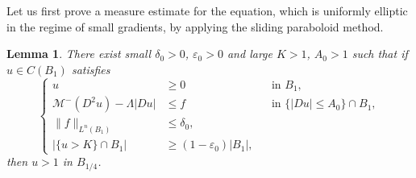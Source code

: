 \documentclass[11pt]{amsart}
\theoremstyle{plain}
\newtheorem{lemma}[theorem]{Lemma}
\theoremstyle{definition}
\numberwithin{equation}{section}
\begin{document}
Let us first prove a measure estimate for the equation, which is uniformly elliptic in the regime of small gradients, by applying the sliding paraboloid method.

\begin{lemma}\label{A00}
    There exist small $\delta_0>0$, $\varepsilon_0>0$ and large $K>1$, $A_0>1$ such that if $u \in C(B_1)$ satisfies
    \begin{equation*}
    \left\{
    \begin{aligned}
        u &\geq 0 &&\text{in } B_1,\\
        \mathcal{M}^-(D^2u)-\Lambda|Du| &\leq f &&\text{in } \{|Du| \leq A_0\}\cap B_1, \\
        \|f\|_{L^n(B_1)} &\leq \delta_0,\\
        |\{u>K\} \cap B_1| &\geq (1-\varepsilon_0)|B_1|,
    \end{aligned}
    \right.
    \end{equation*}
    then $u>1$ in $B_{1/4}$.
\end{lemma}
\end{document}
